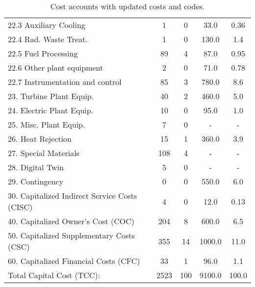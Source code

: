 \begin{table}[h!]
{\begin{tabular}{lcccc}
\hspace{10mm}22.3 Auxiliary Cooling & 1 & 0 & 33.0 & 0.36 \\
\hspace{10mm}22.4 Rad. Waste Treat. & 1 & 0 & 130.0 & 1.4 \\
\hspace{10mm}22.5 Fuel Processing & 89 & 4 & 87.0 & 0.95 \\
\hspace{10mm}22.6 Other plant equipment & 2 & 0 & 71.0 & 0.78 \\
\hspace{10mm}22.7 Instrumentation and control & 85 & 3 & 780.0 & 8.6 \\
\hspace{5mm}23. Turbine Plant Equip. & 40 & 2 & 460.0 & 5.0 \\
\hspace{5mm}24. Electric Plant Equip. & 10 & 0 & 95.0 & 1.0 \\
\hspace{5mm}25. Misc. Plant Equip. & 7 & 0 & - & - \\
\hspace{5mm}26. Heat Rejection & 15 & 1 & 360.0 & 3.9 \\
\hspace{5mm}27. Special Materials & 108 & 4 & - & - \\
\hspace{5mm}28. Digital Twin & 5 & 0 & - & - \\
\hspace{5mm}29. Contingency & 0 & 0 & 550.0 & 6.0 \\
30. Capitalized Indirect Service Costs (CISC) & 4 & 0 & 12.0 & 0.13 \\
40. Capitalized Owner’s Cost (COC) & 204 & 8 & 600.0 & 6.5 \\
50. Capitalized Supplementary Costs (CSC) & 355 & 14 & 1000.0 & 11.0 \\
60. Capitalized Financial Costs (CFC) & 33 & 1 & 96.0 & 1.1 \\
\hline
Total Capital Cost (TCC): & 2523 & 100 & 9100.0 & 100.0 \\
\hline
\end{tabular}
}
\caption{Cost accounts with updated costs and codes. }
\label{tab:costsupdatedcodes}
\end{table}


